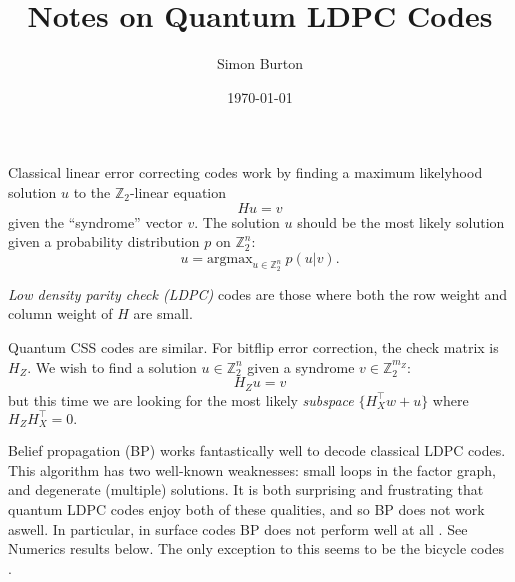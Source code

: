 \documentclass[12pt]{article}
\begin{document}
\title{Notes on Quantum LDPC Codes}

\author{Simon Burton}

\date{\today}


\maketitle




\def\Complex{\mathbb{C}}
\def\C{\mathbb{C}}
\def\Code{\mathcal{C}}
\def\R{\mathbb{R}}
\def\Z{\mathbb{Z}}
\def\Pauli{\mathcal{P}}
\def\Hom{\mbox{Hom}}
\def\Proveit{{\it (Proof??)}}
\def\GL{\mathrm{GL}}
\def\half{\frac{1}{2}}
\def\Im{\mbox{im}}
\def\Ker{\mbox{ker}}
\def\Field{\mathcal{F}}
\def\Defn#1{{\bf #1}}

\newcommand{\ket}[1]{|{#1}\rangle}
\newcommand{\expect}[1]{\langle{#1}\rangle}
\newcommand{\bra}[1]{\langle{#1}|}
\newcommand{\ketbra}[2]{\ket{#1}\!\bra{#2}}
\newcommand{\braket}[2]{\langle{#1}|{#2}\rangle}


%
%

Classical linear error correcting codes
work by finding a maximum likelyhood solution $u$ to
the $\Z_2$-linear equation
$$
    Hu = v
$$
given the ``syndrome'' vector $v$.
The solution $u$ should be the most
likely solution given a probability
distribution $p$ on $\Z_2^n:$
$$
    u = \mbox{argmax}_{u\in\Z_2^n} \  p(u | v).
$$

{\em Low density parity check (LDPC)} codes
are those where both the row weight
and column weight of $H$ are small.

Quantum CSS codes are similar. 
For bitflip error correction,
the check matrix is $H_Z.$
We wish to find a solution $u\in\Z_2^n$ given a
syndrome $v\in\Z_2^{m_Z}:$
$$
    H_Z u = v
$$
but this time we are looking for the most
likely \emph{subspace} 
$ \{ H_X^\top w + u \} $
where $H_Z H_X^\top = 0.$

Belief propagation (BP) works fantastically well to
decode classical LDPC codes.
This algorithm has two well-known weaknesses:
small loops in the factor graph, and degenerate (multiple)
solutions.
It is both surprising and frustrating that 
quantum LDPC codes enjoy both of these qualities,
and so BP does not work aswell.
In particular, in surface codes BP does not
perform well at all \cite{poulin2008}.
See Numerics results below.
The only exception to this seems to be the
bicycle codes \cite{mackay2004}.
\end{document}
